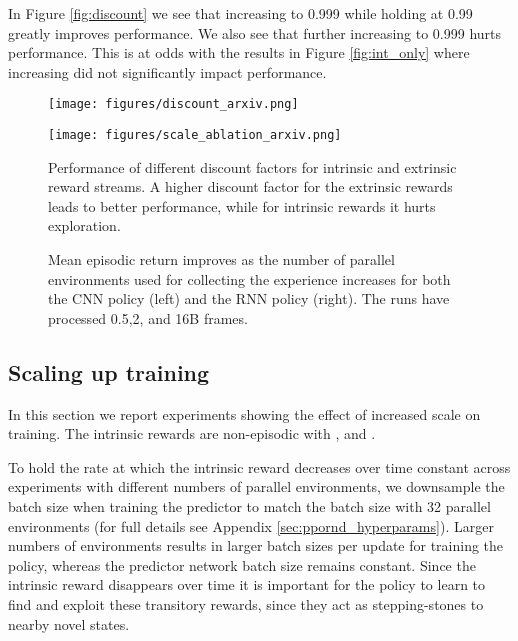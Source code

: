 \documentclass{article} \usepackage[dvipsnames]{xcolor}
\begin{document}
In Figure \ref{fig:discount} we see that increasing  to 0.999 while holding  at 0.99 greatly improves performance. We also see that further increasing  to 0.999 hurts performance. This is at odds with the results in Figure \ref{fig:int_only} where increasing  did not significantly impact performance.
\begin{figure}[tbp]
\centering
\begin{minipage}[t]{0.48\linewidth}
\centering
\texttt{[image: figures/discount\_arxiv.png]}
\end{minipage}\hspace{.02\textwidth}
\begin{minipage}[t]{0.48\linewidth}
\centering
\texttt{[image: figures/scale\_ablation\_arxiv.png]}
\end{minipage}\par
\vspace*{-5pt}
\begin{minipage}[t]{0.48\linewidth}
\caption{Performance of different discount factors for intrinsic and extrinsic reward streams. A higher discount factor for the extrinsic rewards leads to better performance, while for intrinsic rewards it hurts exploration.}
\label{fig:discount}
\end{minipage}\hspace{.02\textwidth}
\begin{minipage}[t]{0.48\linewidth}
\caption{Mean episodic return improves as the number of parallel environments used for collecting the experience increases for both the CNN policy (left) and the RNN policy (right). The runs have processed 0.5,2, and 16B frames.}
\label{fig:scale}
\end{minipage}\vspace*{-20pt}
\end{figure}


\subsection{Scaling up training}
\label{sec:exp_scale}
In this section we report experiments showing the effect of increased scale on training. The intrinsic rewards are non-episodic with , and .

To hold the rate at which the intrinsic reward decreases over time constant across experiments with different numbers of parallel environments, we downsample the batch size when training the predictor to match the batch size with 32 parallel environments (for full details see Appendix \ref{sec:ppornd_hyperparams}). Larger numbers of environments results in larger batch sizes per update for training the policy, whereas the predictor network batch size remains constant. Since the intrinsic reward disappears over time it is important for the policy to learn to find and exploit these transitory rewards, since they act as stepping-stones to nearby novel states.
\end{document}
